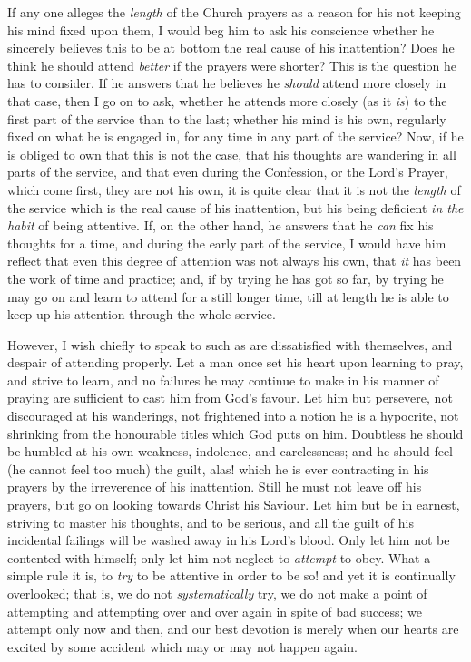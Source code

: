If any one alleges the \emph{length} of the Church
prayers as a reason for his not keeping his mind fixed
upon them, I would beg him to ask his conscience whether
he sincerely believes this to be at bottom the real cause
of his inattention? Does he think he should attend \emph{better}
if the prayers were shorter? This is the question he has
to consider. If he answers that he believes he \emph{should}
attend more closely in that case, then I go on to ask,
whether he attends more closely (as it \emph{is}) to the
first part of the service than to the last; whether his
mind is his own, regularly fixed on what he is engaged
in, for any time in any part of the service? Now, if he
is obliged to own that this is not the case, that his
thoughts are wandering in all parts of the service, and
that even during the Confession, or the Lord's Prayer,
which come first, they are not his own, it is quite clear
that it is not the \emph{length} of the service which is
the real cause of his inattention, but his being
deficient \emph{in the habit} of being attentive. If, on
the other hand, he answers that he \emph{can} fix his
thoughts for a time, and during the early part of the
service, I would have him reflect that even this degree
of attention was not always his own, that \emph{it} has
been the work of time and practice; and, if by trying he
has got so far, by trying he may go on and learn to
attend for a still longer time, till at length he is able
to keep up his attention through the whole service.

However, I wish chiefly to speak to such as are
dissatisfied with themselves, and despair of attending
properly. Let a man once set his heart upon learning to
pray, and strive to learn, and no failures he may
continue to make in his manner of praying are sufficient
to cast him from God's favour. Let him but persevere, not
discouraged at his wanderings, not frightened into a
notion he is a hypocrite, not shrinking from the
honourable titles which God puts on him. Doubtless he
should be humbled at his own weakness, indolence, and
carelessness; and he should feel (he cannot feel too
much) the guilt, alas! which he is ever contracting in
his prayers by the irreverence of his inattention. Still
he must not leave off his prayers, but go on looking
towards Christ his Saviour. Let him but be in earnest,
striving to master his thoughts, and to be serious, and
all the guilt of his incidental failings will be washed away in his Lord's blood. Only let him not be contented
with himself; only let him not neglect to \emph{attempt}
to obey. What a simple rule it is, to \emph{try} to be
attentive in order to be so! and yet it is continually
overlooked; that is, we do not \emph{systematically} try,
we do not make a point of attempting and attempting over
and over again in spite of bad success; we attempt only
now and then, and our best devotion is merely when our
hearts are excited by some accident which may or may not
happen again.

